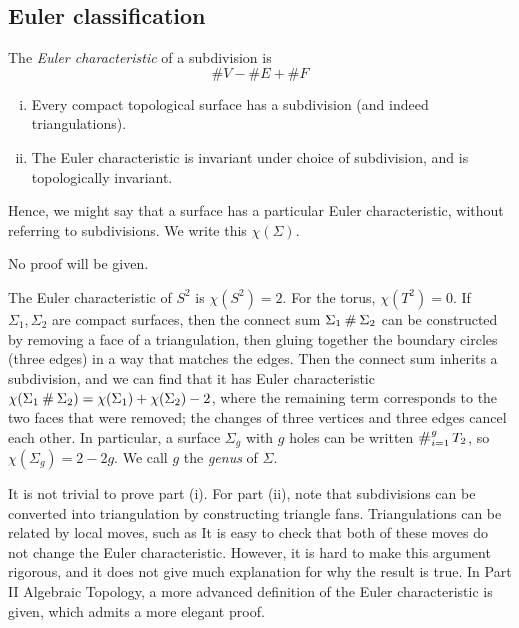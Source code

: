 \subsection{Euler classification}
\begin{definition}
	The \textit{Euler characteristic} of a subdivision is
	\[ \# V - \# E + \# F \]
\end{definition}
\begin{theorem}
	\begin{enumerate}[(i)]
		\item Every compact topological surface has a subdivision (and indeed triangulations).
		\item The Euler characteristic is invariant under choice of subdivision, and is topologically invariant.
	\end{enumerate}
	Hence, we might say that a surface has a particular Euler characteristic, without referring to subdivisions.
	We write this \( \chi(\Sigma) \).
\end{theorem}
No proof will be given.
\begin{example}
	The Euler characteristic of \( S^2 \) is \( \chi(S^2) = 2 \).
	For the torus, \( \chi(T^2) = 0 \).
	If \( \Sigma_1, \Sigma_2 \) are compact surfaces, then the connect sum \( \Sigma_1 \mathbin{\#} \Sigma_2 \) can be constructed by removing a face of a triangulation, then gluing together the boundary circles (three edges) in a way that matches the edges.
	Then the connect sum inherits a subdivision, and we can find that it has Euler characteristic \( \chi(\Sigma_1 \mathbin{\#} \Sigma_2) = \chi(\Sigma_1) + \chi(\Sigma_2) - 2 \), where the remaining term corresponds to the two faces that were removed; the changes of three vertices and three edges cancel each other.
	In particular, a surface \( \Sigma_g \) with \( g \) holes can be written \( \bigconnect_{i=1}^g T_2 \), so \( \chi(\Sigma_g) = 2 - 2g \).
	We call \( g \) the \textit{genus} of \( \Sigma \).
\end{example}
\begin{remark}
	It is not trivial to prove part (i).
	For part (ii), note that subdivisions can be converted into triangulation by constructing triangle fans.
	Triangulations can be related by local moves, such as
	It is easy to check that both of these moves do not change the Euler characteristic.
	However, it is hard to make this argument rigorous, and it does not give much explanation for why the result is true.
	In Part II Algebraic Topology, a more advanced definition of the Euler characteristic is given, which admits a more elegant proof.
\end{remark}
